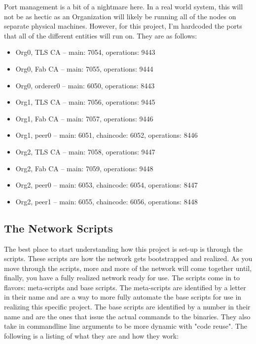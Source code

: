		\hspace{10mm}Port management is a bit of a nightmare here. In a real world system, this will not be as hectic as an Organization will likely be running all of the nodes on separate physical machines. However, for this project, I'm hardcoded the ports that all of the different entities will run on. They are as follows:
			\begin{itemize}
				\item Org0, TLS CA -- main: 7054, operations: 9443
				\item Org0, Fab CA -- main: 7055, operations: 9444
				\item Org0, orderer0 -- main: 6050, operations: 8443
				\item Org1, TLS CA -- main: 7056, operations: 9445
				\item Org1, Fab CA -- main: 7057, operations: 9446
				\item Org1, peer0 -- main: 6051, chaincode: 6052, operations: 8446			
				\item Org2, TLS CA -- main: 7058, operations: 9447
				\item Org2, Fab CA -- main: 7059, operations: 9448
				\item Org2, peer0 -- main: 6053, chaincode: 6054, operations: 8447
				\item Org2, peer1 -- main: 6055, chaincode: 6056, operations: 8448
			\end{itemize}
		
	\subsection{The Network Scripts}
		\hspace{10mm}The best place to start understanding how this project is set-up is through the scripts. These scripts are how the network gets bootstrapped and realized. As you move through the scripts, more and more of the network will come together until, finally, you have a fully realized network ready for use. The scripts come in to flavors: meta-scripts and base scripts. The meta-scripts are identified by a letter in their name and are a way to more fully automate the base scripts for use in realizing this specific project. The base scripts are identified by a number in their name and are the ones that issue the actual commands to the binaries. They also take in commandline line arguments to be more dynamic with "code reuse". The following is a listing of what they are and how they work:\\
		

